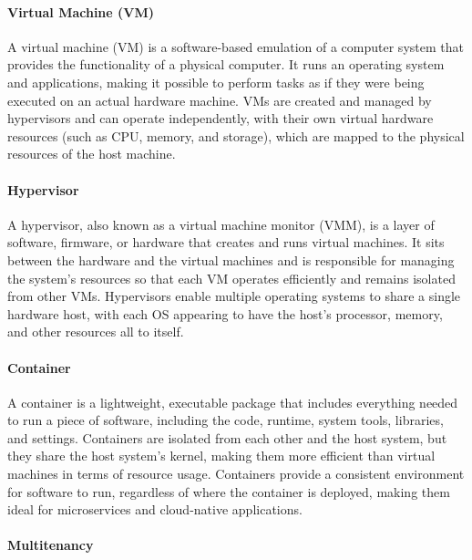\documentclass[10pt, landscape]{article}
\begin{document}
\begin{multicols*}{4}
\paragraph{Virtual Machine (VM)}\label{virtual-machine-vm}

A virtual machine (VM) is a software-based emulation of a computer
system that provides the functionality of a physical computer. It runs
an operating system and applications, making it possible to perform
tasks as if they were being executed on an actual hardware machine. VMs
are created and managed by hypervisors and can operate independently,
with their own virtual hardware resources (such as CPU, memory, and
storage), which are mapped to the physical resources of the host
machine.

\paragraph{Hypervisor}\label{hypervisor}

A hypervisor, also known as a virtual machine monitor (VMM), is a layer
of software, firmware, or hardware that creates and runs virtual
machines. It sits between the hardware and the virtual machines and is
responsible for managing the system's resources so that each VM operates
efficiently and remains isolated from other VMs. Hypervisors enable
multiple operating systems to share a single hardware host, with each OS
appearing to have the host's processor, memory, and other resources all
to itself.

\paragraph{Container}\label{container}

A container is a lightweight, executable package that includes
everything needed to run a piece of software, including the code,
runtime, system tools, libraries, and settings. Containers are isolated
from each other and the host system, but they share the host system's
kernel, making them more efficient than virtual machines in terms of
resource usage. Containers provide a consistent environment for software
to run, regardless of where the container is deployed, making them ideal
for microservices and cloud-native applications.

\paragraph{Multitenancy}\label{multitenancy-1}


\end{multicols*}
\end{document}

